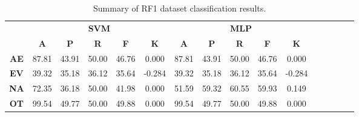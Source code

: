 \begin{landscape}
\begin{table}[htbp]
\footnotesize
\centering
\caption{Summary of RF1 dataset classification results.}
\label{tab:base_female}
\begin{tabular}{|c|c|c|c|c|c|c|c|c|c|c|c|c|c|c|c|}
\hline
\multirow{2}{*}{}	& \multicolumn{5}{c|}{\textbf{SVM}}												& \multicolumn{5}{c|}{\textbf{MLP}}												\\ \cline{2-11} 
					& \textbf{A}	& \textbf{P}	& \textbf{R}	& \textbf{F}	& \textbf{K}	& \textbf{A}	& \textbf{P}	& \textbf{R}	& \textbf{F}	& \textbf{K}	\\ \hline
\textbf{AE}			& 87.81			& 43.91			& 50.00			& 46.76			& 0.000			& 87.81			& 43.91			& 50.00			& 46.76			& 0.000			\\ \hline
\textbf{EV}			& 39.32			& 35.18			& 36.12			& 35.64			& -0.284			& 39.32			& 35.18			& 36.12			& 35.64			& -0.284			\\ \hline
\textbf{NA}			& 72.35			& 36.18			& 50.00			& 41.98			& 0.000			& 51.59			& 59.32			& 60.55			& 59.93			& 0.149			\\ \hline
\textbf{OT}			& 99.54			& 49.77			& 50.00			& 49.88			& 0.000			& 99.54			& 49.77			& 50.00			& 49.88			& 0.000			\\ \hline
\end{tabular}
\end{table}
\end{landscape}